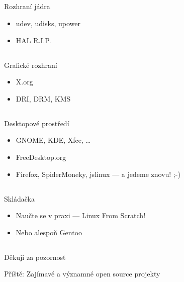 \documentclass{beamer}
\begin{document}
\subsection{}
\begin{frame}{Rozhraní jádra}
\begin{itemize}
\item udev, udisks, upower
\item HAL R.I.P.
\end{itemize}
\end{frame}

\subsection{}
\begin{frame}{Grafické rozhraní}
\begin{itemize}
\item X.org
\item DRI, DRM, KMS
\end{itemize}
\end{frame}

\subsection{}
\begin{frame}{Desktopové prostředí}
\begin{itemize}
\item GNOME, KDE, Xfce, \dots
\item FreeDesktop.org
\item Firefox, SpiderMoneky, jslinux --- a jedeme znovu! ;-)
\end{itemize}
\end{frame}

\subsection{}
\begin{frame}{Skládačka}
\begin{itemize}
\item Naučte se v praxi --- Linux From Scratch!
\item Nebo alespoň Gentoo
\end{itemize}
\end{frame}

\subsection{}
\begin{frame}{Děkuji za pozornost}
\begin{center}
Příště: Zajímavé a významné open source projekty
\end{center}
\end{frame}
\end{document}
